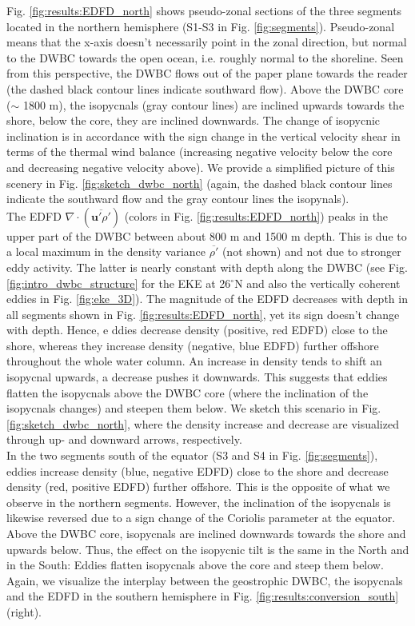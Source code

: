 \documentclass{ametsoc}
\begin{document}
Fig. \ref{fig:results:EDFD_north} shows pseudo-zonal sections of the three segments located in the northern hemisphere (S1-S3 in Fig. \ref{fig:segments}). Pseudo-zonal means that the x-axis doesn't necessarily point in the zonal direction, but normal to the DWBC towards the open ocean, i.e. roughly normal to the shoreline. Seen from this perspective, the DWBC flows out of the paper plane towards the reader (the dashed black contour lines indicate southward flow). Above the DWBC core ($\sim$ 1800 m), the isopycnals (gray contour lines) are inclined upwards towards the shore, below the core, they are inclined downwards. The change of isopycnic inclination is in accordance with the sign change in the vertical velocity shear in terms of the thermal wind balance (increasing negative velocity below the core and decreasing negative velocity above). We provide a simplified picture of this scenery in Fig. \ref{fig:sketch_dwbc_north} (again, the dashed black contour lines indicate the southward flow and the gray contour lines the isopynals). \\
The EDFD $\nabla \cdot (\overline{\mathbf u' \rho'})$ (colors in Fig. \ref{fig:results:EDFD_north}) peaks in the upper part of the DWBC between about 800 m and 1500 m depth. This is due to a local maximum in the density variance $\overline{\rho'}$ (not shown) and not due to stronger eddy activity. The latter is nearly constant with depth along the DWBC (see Fig. \ref{fig:intro_dwbc_structure} for the EKE at 26$^\circ$N and also the vertically coherent eddies in Fig. \ref{fig:eke_3D}). The magnitude of the EDFD decreases with depth in all segments shown in Fig. \ref{fig:results:EDFD_north}, yet its sign doesn't change with depth. Hence, e
ddies decrease density (positive, red EDFD) close to the shore, whereas they increase density (negative, blue EDFD) further offshore throughout the whole water column. An increase in density tends to shift an isopycnal upwards, a decrease pushes it downwards. This suggests that eddies flatten the isopycnals above the DWBC core (where the inclination of the isopycnals changes) and steepen them below. We sketch this scenario in Fig. \ref{fig:sketch_dwbc_north}, where the density increase and decrease are visualized through up- and downward arrows, respectively. \\
In the two segments south of the equator (S3 and S4 in Fig. \ref{fig:segments}), eddies increase density (blue, negative EDFD) close to the shore and decrease density (red, positive EDFD) further offshore. This is the opposite of what we observe in the northern segments. However, the inclination of the isopycnals is likewise reversed due to a sign change of the Coriolis parameter at the equator. Above the DWBC core, isopycnals are inclined downwards towards the shore and upwards below. Thus, the effect on the isopycnic tilt is the same in the North and in the South: Eddies flatten isopycnals above the core and steep them below. Again, we visualize the interplay between the geostrophic DWBC, the isopycnals and the EDFD in the southern hemisphere in Fig. \ref{fig:results:conversion_south} (right). 
\end{document}
